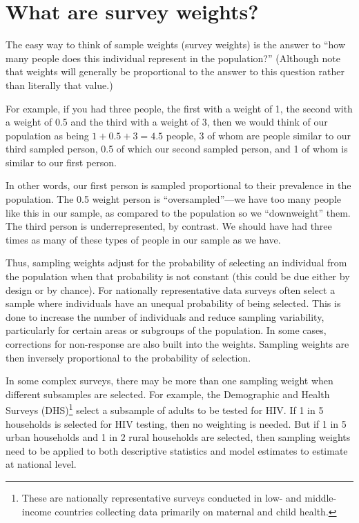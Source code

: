 \documentclass[
  letterpaper,
  DIV=11,
  numbers=noendperiod]{scrreprt}
\begin{document}
\hypertarget{what-are-survey-weights}{%
\section{What are survey weights?}\label{what-are-survey-weights}}

The easy way to think of sample weights (survey weights) is the answer
to ``how many people does this individual represent in the population?''
(Although note that weights will generally be proportional to the answer
to this question rather than literally that value.)

For example, if you had three people, the first with a weight of 1, the
second with a weight of 0.5 and the third with a weight of 3, then we
would think of our population as being \(1 + 0.5 + 3 = 4.5\) people, 3
of whom are people similar to our third sampled person, 0.5 of which our
second sampled person, and 1 of whom is similar to our first person.

In other words, our first person is sampled proportional to their
prevalence in the population. The 0.5 weight person is
``oversampled''---we have too many people like this in our sample, as
compared to the population so we ``downweight'' them. The third person
is underrepresented, by contrast. We should have had three times as many
of these types of people in our sample as we have.

Thus, sampling weights adjust for the probability of selecting an
individual from the population when that probability is not constant
(this could be due either by design or by chance). For nationally
representative data surveys often select a sample where individuals have
an unequal probability of being selected. This is done to increase the
number of individuals and reduce sampling variability, particularly for
certain areas or subgroups of the population. In some cases, corrections
for non-response are also built into the weights. Sampling weights are
then inversely proportional to the probability of selection.

In some complex surveys, there may be more than one sampling weight when
different subsamples are selected. For example, the Demographic and
Health Surveys (DHS)\footnote{These are nationally representative
  surveys conducted in low- and middle-income countries collecting data
  primarily on maternal and child health.} select a subsample of adults
to be tested for HIV. If 1 in 5 households is selected for HIV testing,
then no weighting is needed. But if 1 in 5 urban households and 1 in 2
rural households are selected, then sampling weights need to be applied
to both descriptive statistics and model estimates to estimate at
national level.
\end{document}

